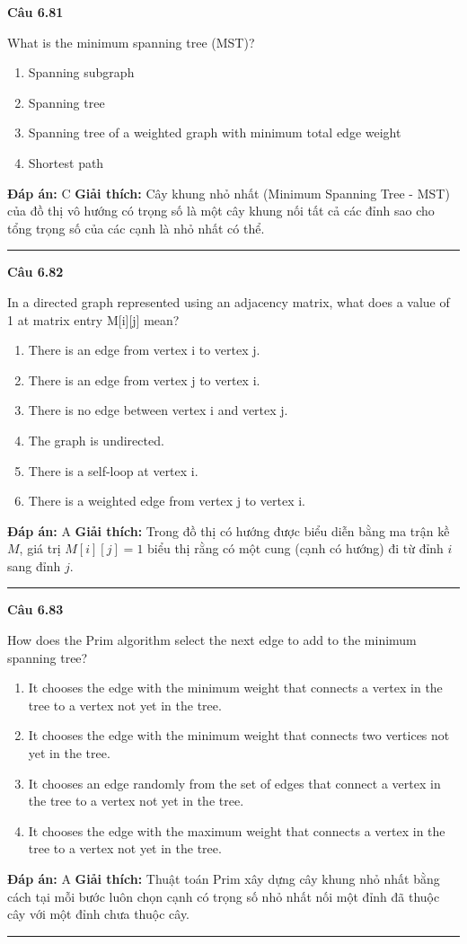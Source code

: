 \documentclass[11pt,a4paper]{article}
\newenvironment{question}[1]{%
  \par\vspace{1em}\noindent\textbf{\large Câu #1}\par\vspace{0.4em}
}{%
  \par\vspace{1em}\hrule\vspace{0.6em}
}
\newenvironment{choices}{%
  \begin{enumerate}[label=\textbf{\Alph*.},leftmargin=2.2em,itemsep=2pt,topsep=3pt]
}{%
  \end{enumerate}
}
\newcommand{\choice}{\item}
\begin{document}
\begin{question}{6.81}
What is the minimum spanning tree (MST)?
\begin{choices}
\choice Spanning subgraph
\choice Spanning tree
\choice Spanning tree of a weighted graph with minimum total edge weight
\choice Shortest path
\end{choices}
\textbf{Đáp án:} C
\textbf{Giải thích:} Cây khung nhỏ nhất (Minimum Spanning Tree - MST) của đồ thị vô hướng có trọng số là một cây khung nối tất cả các đỉnh sao cho tổng trọng số của các cạnh là nhỏ nhất có thể.
\end{question}

\begin{question}{6.82}
In a directed graph represented using an adjacency matrix, what does a value of 1 at matrix entry M[i][j] mean?
\begin{choices}
\choice There is an edge from vertex i to vertex j.
\choice There is an edge from vertex j to vertex i.
\choice There is no edge between vertex i and vertex j.
\choice The graph is undirected.
\choice There is a self-loop at vertex i.
\choice There is a weighted edge from vertex j to vertex i.
\end{choices}
\textbf{Đáp án:} A
\textbf{Giải thích:} Trong đồ thị có hướng được biểu diễn bằng ma trận kề \(M\), giá trị \(M[i][j] = 1\) biểu thị rằng có một cung (cạnh có hướng) đi từ đỉnh \(i\) sang đỉnh \(j\).
\end{question}

\begin{question}{6.83}
How does the Prim algorithm select the next edge to add to the minimum spanning tree?
\begin{choices}
\choice It chooses the edge with the minimum weight that connects a vertex in the tree to a vertex not yet in the tree.
\choice It chooses the edge with the minimum weight that connects two vertices not yet in the tree.
\choice It chooses an edge randomly from the set of edges that connect a vertex in the tree to a vertex not yet in the tree.
\choice It chooses the edge with the maximum weight that connects a vertex in the tree to a vertex not yet in the tree.
\end{choices}
\textbf{Đáp án:} A
\textbf{Giải thích:} Thuật toán Prim xây dựng cây khung nhỏ nhất bằng cách tại mỗi bước luôn chọn cạnh có trọng số nhỏ nhất nối một đỉnh đã thuộc cây với một đỉnh chưa thuộc cây.
\end{question}
\end{document}
